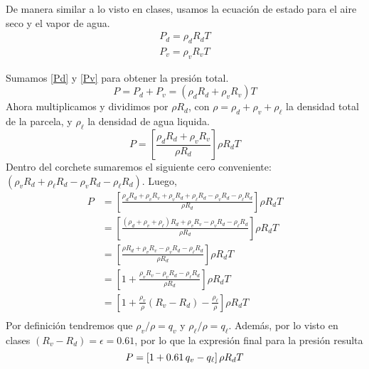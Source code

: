 \documentclass[class=article, crop=false]{standalone}
\begin{document}
De manera similar a lo visto en clases, usamos la ecuación de estado para el aire seco y el vapor de agua.
\begin{align}
    P_d = \rho_d R_d T\label{Pd}\\ 
    P_v = \rho_v R_v T\label{Pv}
\end{align}

Sumamos \eqref{Pd} y \eqref{Pv} para obtener la presión total.
$$    P = P_d + P_v = (\rho_d R_d + \rho_v R_v) T $$
Ahora multiplicamos y dividimos por $\rho R_d$, con $\rho = \rho_d + \rho_v + \rho_\ell$ la densidad total de la parcela, y $\rho_\ell$ la densidad de agua liquida.
\begin{equation}
    P = \left[ \frac{\rho_d R_d + \rho_v R_v}{\rho R_d} \right]\rho R_d T
\end{equation}
Dentro del corchete sumaremos el siguiente cero conveniente: $(\rho_v R_d + \rho_\ell R_d - \rho_v R_d - \rho_\ell R_d)$. Luego, 
\begin{align*}
    P &= \left[ \frac{\rho_d R_d + \rho_v R_v + \rho_v R_d + \rho_\ell R_d - \rho_v R_d - \rho_\ell R_d }{\rho R_d} \right]\rho R_d T\\
    &=  \left[ \frac{(\rho_d + \rho_v + \rho_\ell) R_d +  \rho_v R_v - \rho_v R_d - \rho_\ell R_d }{\rho R_d} \right]\rho R_d T\\
    &=  \left[ \frac{\rho R_d +  \rho_v R_v - \rho_v R_d - \rho_\ell R_d }{\rho R_d} \right]\rho R_d T\\
    &=  \left[ 1 + \frac{ \rho_v R_v - \rho_v R_d - \rho_\ell R_d }{\rho R_d} \right]\rho R_d T\\
    &=  \left[ 1 + \frac{ \rho_v }{\rho }(R_v - R_d) - \frac{\rho_\ell}{\rho} \right]\rho R_d T\\
\end{align*}
Por definición tendremos que $\rho_v/\rho = q_v$ y $\rho_\ell/\rho = q_\ell$. Además, por lo visto en clases $(R_v - R_d) = \epsilon = 0.61$, por lo que la expresión final para la presión resulta
\begin{equation}
    P=  \left[ 1 + 0.61\, q_v - q_\ell \right]\rho R_d T\\
\end{equation}
\end{document}
